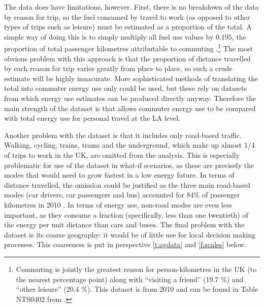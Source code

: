 \documentclass[a4paper, 11pt, twoside]{Thesis}
\begin{document}
The data does have limitations, however. First, there is no breakdown of the
data by reason for trip, so the fuel consumed by travel to work (as opposed to
other types of trips such as leisure) must be estimated as a proportion of the
total. A simple way of doing this is to simply multiply all fuel use values
by 0.195, the proportion of total passenger kilometres attributable to
commuting \citep{NationalTravelStatistics2012}.\footnote{Commuting is jointly
the greatest reason for person-kilometres in the UK (to the nearest percentage
point) along with ``visiting a friend'' (19.7 \%) and ``other leisure'' (20.4
\%). This dataset is from 2010 and can be found in Table NTS0402 from
\citet{NationalTravelStatistics2012}.
}
The most obvious problem with this approach is that the proportion of
distance travelled by each reason for trip varies greatly from place to
place, 
so such a crude estimate will be highly innacurate. More sophisticated
methods of translating the total into commuter energy use only could be used,
but these rely on datasets from which energy use estimates can be produced
directly anyway. Therefore the main strength of the dataset is that allows
commuter energy use to be compared with total energy use for personal travel at
the LA level.

Another problem with the \citet{Decc2008-tcons} dataset is that it includes only
road-based traffic. Walking, cycling, trains, trams and the underground, which
make up almost 1/4 of trips to work in the UK, are
omitted from the analysis. This is especially problematic for use of the
dataset in what-if scenarios, as these are precisely the modes that would
need to grow fastest in a low energy future. In terms of distance travelled,
the omission could be justified as the three main road-based modes (car
drivers, car
passengers and bus) accounted for 84\% of passenger kilometres in 2010
\citep{NationalTravelStatistics2012}. In terms of energy use, non-road modes
are even less important, as they consume a fraction (specifically, less than
one twentieth) of the energy per unit
distance than cars and buses. The final problem with the dataset is its coarse
geography: it would be of little use for local decision making processes. This
coarseness is put in perspective \cref{t:agdata} and \cref{f:scales} below.
 
\end{document}
